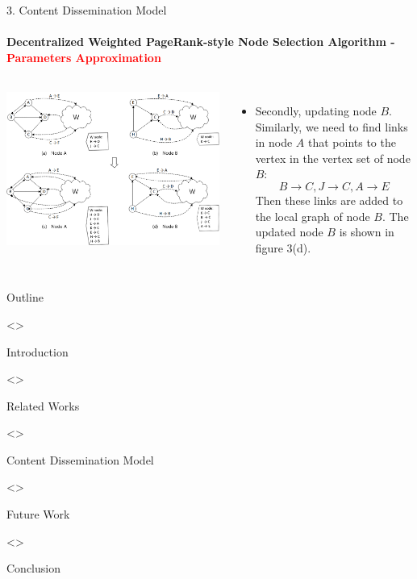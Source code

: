 \documentclass{beamer}		%
\begin{document}
\begin{frame}{3. Content Dissemination Model}
\framesubtitle{Decentralized Weighted PageRank-style Node Selection Algorithm - \textcolor{red}{Parameters Approximation}}
\begin{columns}
\includegraphics[scale=0.048]{Fig3.png}
\begin{itemize}
   \item Secondly, updating node $B$. Similarly, we need to find links in node $A$ that points to the vertex in the vertex set of node $B$: \[{B\rightarrow C,J\rightarrow C,A\rightarrow E}\] Then these links are added to the local graph of node $B$. The updated node $B$ is shown in figure 3(d).
\end{itemize}
\end{columns}
\end{frame}



\begin{frame}{Outline}
\begin{enumerate}[1. ]
\uncover<>{\item Introduction}
\uncover<>{\item Related Works}
\uncover<>{\item Content Dissemination Model}
\uncover<>{\item Future Work}
\uncover<>{\item Conclusion}
\end{enumerate}
\end{frame}
\end{document}
